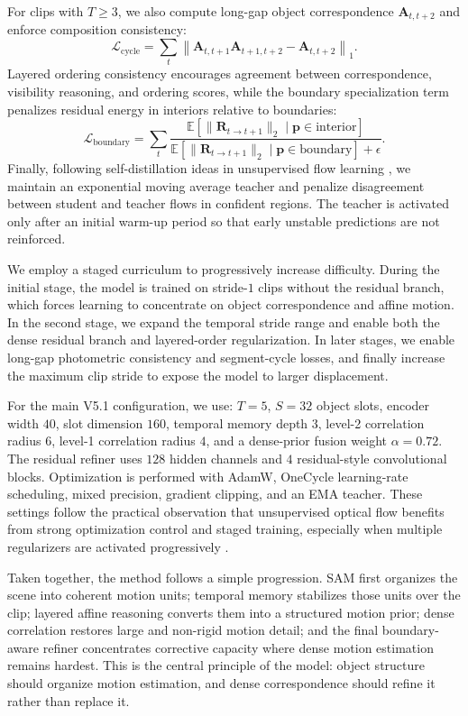 For clips with $T\geq 3$, we also compute long-gap object correspondence $\mathbf{A}_{t,t+2}$ and enforce composition consistency:
\begin{equation}
\mathcal{L}_{\mathrm{cycle}} = \sum_t \left\| \mathbf{A}_{t,t+1}\mathbf{A}_{t+1,t+2} - \mathbf{A}_{t,t+2} \right\|_1.
\end{equation}
Layered ordering consistency encourages agreement between correspondence, visibility reasoning, and ordering scores, while the boundary specialization term penalizes residual energy in interiors relative to boundaries:
\begin{equation}
\mathcal{L}_{\mathrm{boundary}} = \sum_t \frac{\mathbb{E}[\|\mathbf{R}_{t\rightarrow t+1}\|_2 \mid \mathbf{p}\in \mathrm{interior}]}{\mathbb{E}[\|\mathbf{R}_{t\rightarrow t+1}\|_2 \mid \mathbf{p}\in \mathrm{boundary}] + \epsilon}.
\end{equation}
Finally, following self-distillation ideas in unsupervised flow learning \cite{liu2019ddflow}, we maintain an exponential moving average teacher and penalize disagreement between student and teacher flows in confident regions. The teacher is activated only after an initial warm-up period so that early unstable predictions are not reinforced.

We employ a staged curriculum to progressively increase difficulty. During the initial stage, the model is trained on stride-$1$ clips without the residual branch, which forces learning to concentrate on object correspondence and affine motion. In the second stage, we expand the temporal stride range and enable both the dense residual branch and layered-order regularization. In later stages, we enable long-gap photometric consistency and segment-cycle losses, and finally increase the maximum clip stride to expose the model to larger displacement.

For the main V5.1 configuration, we use: $T=5$, $S=32$ object slots, encoder width $40$, slot dimension $160$, temporal memory depth $3$, level-2 correlation radius $6$, level-1 correlation radius $4$, and a dense-prior fusion weight $\alpha=0.72$. The residual refiner uses $128$ hidden channels and $4$ residual-style convolutional blocks. Optimization is performed with AdamW, OneCycle learning-rate scheduling, mixed precision, gradient clipping, and an EMA teacher. These settings follow the practical observation that unsupervised optical flow benefits from strong optimization control and staged training, especially when multiple regularizers are activated progressively \cite{meister2018unflow,liu2019ddflow}.

Taken together, the method follows a simple progression. SAM first organizes the scene into coherent motion units; temporal memory stabilizes those units over the clip; layered affine reasoning converts them into a structured motion prior; dense correlation restores large and non-rigid motion detail; and the final boundary-aware refiner concentrates corrective capacity where dense motion estimation remains hardest. This is the central principle of the model: object structure should organize motion estimation, and dense correspondence should refine it rather than replace it.

